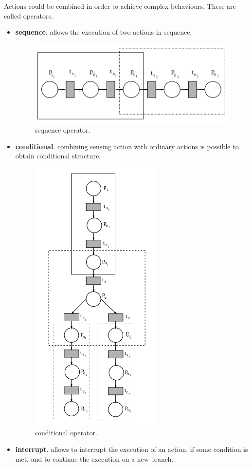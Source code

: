\documentclass[pdftex,12pt,a4paper]{report}
\begin{document}
\noindent Actions could be combined in order to achieve complex behaviours. These are called operators.
\begin{itemize}
\item \textbf{sequence}. allows the execution of two actions in sequence.
\begin{figure}[H]
	\centering
	\includegraphics[scale=0.5]{images/sequence.png}
	\caption{sequence operator.}
\end{figure}
\item \textbf{conditional}. combining sensing action with ordinary actions is possible to obtain conditional structure.
\begin{figure}[H]
	\centering
	\includegraphics[scale=0.5]{images/conditional.png}
	\caption{conditional operator.}
\end{figure}
\item \textbf{interrupt}. allows to interrupt the execution of an action, if some condition is met, and to continue the execution on a new branch.

\end{itemize}
\end{document}
